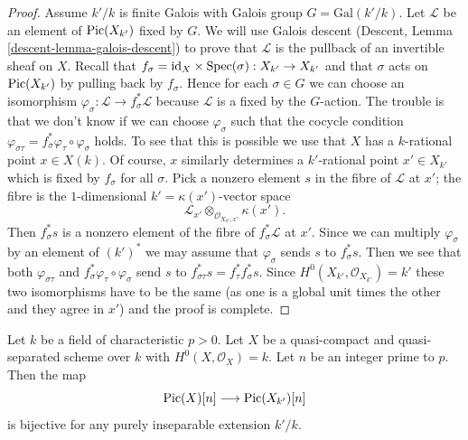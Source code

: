 \begin{proof}
\medskip\noindent
Assume $k'/k$ is finite Galois with Galois group $G = \text{Gal}(k'/k)$.
Let $\mathcal{L}$ be an element of $\mathop{\mathrm{Pic}}\nolimits(X_{k'})$ fixed by $G$.
We will use Galois descent (Descent, Lemma \ref{descent-lemma-galois-descent})
to prove that $\mathcal{L}$ is the pullback of an invertible sheaf on $X$.
Recall that $f_\sigma = \text{id}_X \times \mathop{\mathrm{Spec}}(\sigma) : X_{k'} \to X_{k'}$
and that $\sigma$ acts on $\mathop{\mathrm{Pic}}\nolimits(X_{k'})$ by pulling back by $f_\sigma$.
Hence for each $\sigma \in G$ we can choose an isomorphism
$\varphi_\sigma : \mathcal{L} \to f_\sigma^*\mathcal{L}$
because $\mathcal{L}$ is a fixed by the $G$-action.
The trouble is that we don't know if we can choose
$\varphi_\sigma$ such that the cocycle condition
$\varphi_{\sigma\tau} = f_\sigma^*\varphi_\tau \circ \varphi_\sigma$
holds. To see that this is possible we use that $X$ has a $k$-rational point
$x \in X(k)$. Of course, $x$ similarly determines a $k'$-rational point
$x' \in X_{k'}$ which is fixed by $f_\sigma$ for all $\sigma$.
Pick a nonzero element $s$ in the fibre of $\mathcal{L}$ at $x'$;
the fibre is the $1$-dimensional $k' = \kappa(x')$-vector space
$$
\mathcal{L}_{x'} \otimes_{\mathcal{O}_{X_{k'}, x'}} \kappa(x').
$$
Then $f_\sigma^*s$ is a nonzero element of the fibre of
$f_\sigma^*\mathcal{L}$ at $x'$. Since we can multiply $\varphi_\sigma$
by an element of $(k')^*$ we may assume that $\varphi_\sigma$ sends
$s$ to $f_\sigma^*s$. Then we see that both $\varphi_{\sigma\tau}$ and
$f_\sigma^*\varphi_\tau \circ \varphi_\sigma$
send $s$ to $f_{\sigma\tau}^*s = f_\tau^*f_\sigma^*s$.
Since $H^0(X_{k'}, \mathcal{O}_{X_{k'}}) = k'$ these two isomorphisms
have to be the same (as one is a global unit times the other
and they agree in $x'$) and the proof is complete.
\end{proof}

\begin{lemma}
\label{lemma-torsion-descends}
Let $k$ be a field of characteristic $p > 0$. Let $X$ be a
quasi-compact and quasi-separated scheme over $k$ with
$H^0(X, \mathcal{O}_X) = k$. Let $n$ be an integer prime to $p$.
Then the map
$$
\mathop{\mathrm{Pic}}\nolimits(X)[n] \longrightarrow \mathop{\mathrm{Pic}}\nolimits(X_{k'})[n]
$$
is bijective for any purely inseparable extension $k'/k$.
\end{lemma}

